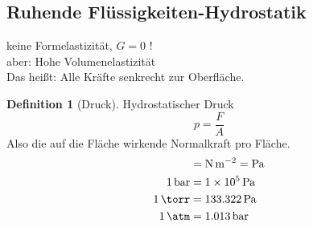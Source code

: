 \documentclass[a4paper]{scrartcl}
\theoremstyle{definition}
\newtheorem{defn}{Definition}
\theoremstyle{plain}
\theoremstyle{plain}
\theoremstyle{remark}
\theoremstyle{remark}
\theoremstyle{remark}
\begin{document}
\subsection{Ruhende Flüssigkeiten-Hydrostatik}
\label{sec-9-4}
keine Formelastizität, $G = 0$ ! \\
   aber: Hohe Volumenelastizität \\
   Das heißt: Alle Kräfte senkrecht zur Oberfläche.
\begin{defn}[Druck]
Hydrostatischer Druck
\[p = \frac{F}{A}\]
Also die auf die Fläche wirkende Normalkraft pro Fläche.
\begin{align*}
[p] &= \si{\newton\per\meter\squared} = \si{\pascal} \\
\SI{1}{\bar} &= \SI{1e5}{\pascal} \\
\SI{1}{\torr} &= \SI{133.322}{\pascal} \\
\SI{1}{\atm} &= \SI{1.013}{\bar} \\
\end{align*}
\end{defn}
\end{document}
